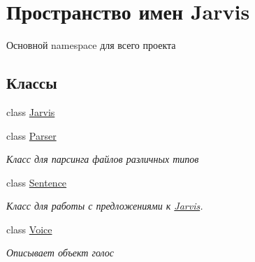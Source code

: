 \hypertarget{namespaceJarvis}{}\section{Пространство имен Jarvis}
\label{namespaceJarvis}


Основной namespace для всего проекта  


\subsection*{Классы}
\begin{DoxyCompactItemize}
\item 
class \hyperlink{classJarvis_1_1Jarvis}{Jarvis}
\item 
class \hyperlink{classJarvis_1_1Parser}{Parser}
\begin{DoxyCompactList}\small\item\em Класс для парсинга файлов различных типов \end{DoxyCompactList}\item 
class \hyperlink{classJarvis_1_1Sentence}{Sentence}
\begin{DoxyCompactList}\small\item\em Класс для работы с предложениями к \hyperlink{classJarvis_1_1Jarvis}{Jarvis}. \end{DoxyCompactList}\item 
class \hyperlink{classJarvis_1_1Voice}{Voice}
\begin{DoxyCompactList}\small\item\em Описывает объект голос \end{DoxyCompactList}\end{DoxyCompactItemize}
